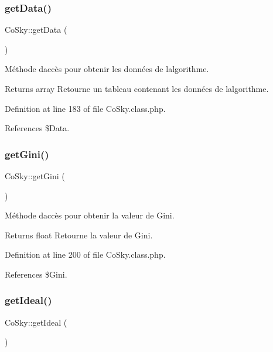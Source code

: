 \subsubsection{\texorpdfstring{get\+Data()}{getData()}}
{\footnotesize\ttfamily Co\+Sky\+::get\+Data (\begin{DoxyParamCaption}{ }\end{DoxyParamCaption})}

Méthode d\textquotesingle{}accès pour obtenir les données de l\textquotesingle{}algorithme.

\begin{DoxyReturn}{Returns}
array Retourne un tableau contenant les données de l\textquotesingle{}algorithme. 
\end{DoxyReturn}


Definition at line 183 of file Co\+Sky.\+class.\+php.



References \$\+Data.

\mbox{\label{class_co_sky_a86823c8c7288ca91d882912fae1e2dbd}} 
\subsubsection{\texorpdfstring{get\+Gini()}{getGini()}}
{\footnotesize\ttfamily Co\+Sky\+::get\+Gini (\begin{DoxyParamCaption}{ }\end{DoxyParamCaption})}

Méthode d\textquotesingle{}accès pour obtenir la valeur de Gini.

\begin{DoxyReturn}{Returns}
float Retourne la valeur de Gini. 
\end{DoxyReturn}


Definition at line 200 of file Co\+Sky.\+class.\+php.



References \$\+Gini.

\mbox{\label{class_co_sky_a0cc4923fbeb96a5835edea9dbaf00520}} 
\subsubsection{\texorpdfstring{get\+Ideal()}{getIdeal()}}
{\footnotesize\ttfamily Co\+Sky\+::get\+Ideal (\begin{DoxyParamCaption}{ }\end{DoxyParamCaption})}

